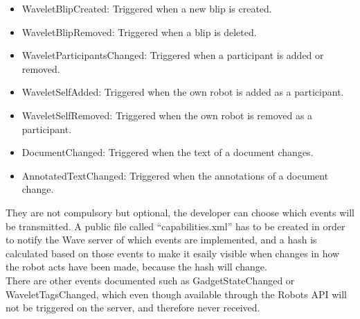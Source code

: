 \begin{itemize}
  \item WaveletBlipCreated: Triggered when a new blip is created.
  \item WaveletBlipRemoved: Triggered when a blip is deleted.
  \item WaveletParticipantsChanged: Triggered when a participant is added or removed.
  \item WaveletSelfAdded: Triggered when the own robot is added as a participant.
  \item WaveletSelfRemoved: Triggered when the own robot is removed as a participant.
  \item DocumentChanged: Triggered when the text of a document changes.
  \item AnnotatedTextChanged: Triggered when the annotations of a document change.
\end{itemize}
They are not compulsory but optional, the developer can choose which events will be transmitted. A public file called ``capabilities.xml'' has to be created in order to notify the Wave server of which events are implemented, and a hash is calculated based on those events to make it esaily visible when changes in how the robot acts have been made, because the hash will change.\\[.2cm]
There are other events documented such as GadgetStateChanged or WaveletTagsChanged, which even though available through the Robots API will not be triggered on the server, and therefore never received.
